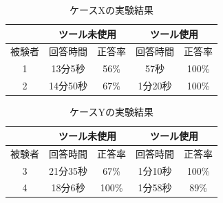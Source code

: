       \begin{table}[tp]
        \begin{center}
          \caption{ケースXの実験結果}
          \label{resultX}
          \begin{tabular}{c|c|c|c|c|}
          \cline{2-5}
                                    & \multicolumn{2}{c|}{ツール未使用} & \multicolumn{2}{c|}{ツール使用} \\ \hline
          \multicolumn{1}{|c||}{被験者} & 回答時間           & 正答率          & 回答時間           & 正答率         \\ \hline\hline
          \multicolumn{1}{|c||}{1}   & 13分5秒           & 56\%         & 57秒           & 100\%         \\ \hline
          \multicolumn{1}{|c||}{2}   & 14分50秒          & 67\%          & 1分20秒          & 100\%         \\ \hline
          \end{tabular}
        \end{center}
      \end{table}

      \begin{table}[tp]
        \begin{center}
          \caption{ケースYの実験結果}
          \label{resultY}
          \begin{tabular}{c|c|c|c|c|}
          \cline{2-5}
                                    & \multicolumn{2}{c|}{ツール未使用} & \multicolumn{2}{c|}{ツール使用} \\ \hline
          \multicolumn{1}{|c||}{被験者} & 回答時間           & 正答率          & 回答時間           & 正答率         \\ \hline\hline
          \multicolumn{1}{|c||}{3}   & 21分35秒           & 67\%         & 1分10秒           & 100\%         \\ \hline
          \multicolumn{1}{|c||}{4}   & 18分6秒          & 100\%          & 1分58秒          & 89\%         \\ \hline
          \end{tabular}
        \end{center}
      \end{table}

